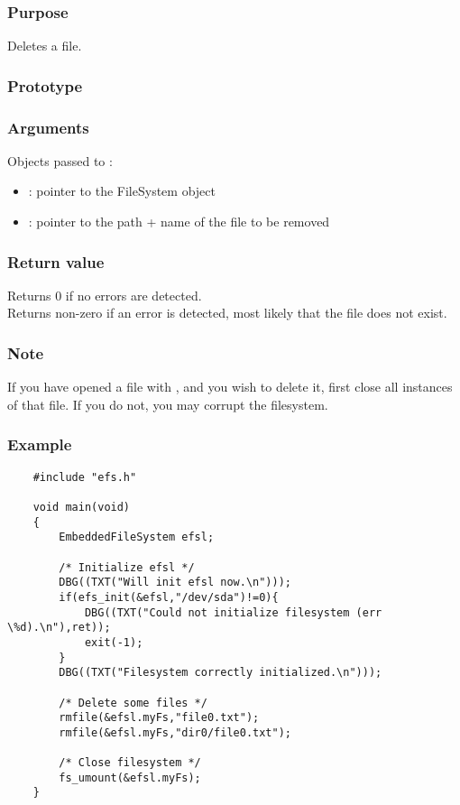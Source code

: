 \subsubsection*{Purpose}
Deletes a file.
\subsubsection*{Prototype}
\subsubsection*{Arguments}
Objects passed to :
\begin{itemize}
	\item{: pointer to the FileSystem object}
	\item{: pointer to the path + name of the file to be removed}
\end{itemize}
\subsubsection*{Return value}
Returns 0 if no errors are detected.\\
\newline
Returns non-zero if an error is detected, most likely that the file does not exist.
\subsubsection*{Note}
If you have opened a file with , and you wish to delete it, first
close all instances of that file. If you do not, you may corrupt the filesystem.
\subsubsection*{Example}
\lstset{numbers=left, stepnumber=1, numberstyle=\small, numbersep=5pt, tabsize=4}
\begin{lstlisting}
	#include "efs.h"

	void main(void)
	{
		EmbeddedFileSystem efsl;

		/* Initialize efsl */
		DBG((TXT("Will init efsl now.\n")));
		if(efs_init(&efsl,"/dev/sda")!=0){
			DBG((TXT("Could not initialize filesystem (err \%d).\n"),ret));
			exit(-1);
		}
		DBG((TXT("Filesystem correctly initialized.\n")));

		/* Delete some files */
		rmfile(&efsl.myFs,"file0.txt");
		rmfile(&efsl.myFs,"dir0/file0.txt");

		/* Close filesystem */
		fs_umount(&efsl.myFs);
	}
\end{lstlisting}
